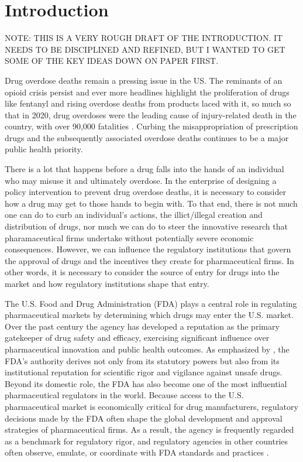 \section{Introduction}

NOTE: THIS IS A VERY ROUGH DRAFT OF THE INTRODUCTION. IT NEEDS TO BE DISCIPLINED AND REFINED, BUT I WANTED TO GET SOME OF THE KEY IDEAS DOWN ON PAPER FIRST.


Drug overdose deaths remain a pressing issue in the US. The reminants of an opioid crisis persist and ever more headlines highlight the proliferation of drugs like fentanyl and rising overdose deaths from products laced with it, so much so that in 2020, drug overdoses were the leading cause of injury-related death in the country, with over 90,000 fatalities \parencite{hedegaardDrugOverdoseDeaths2020a}. Curbing the misappropriation of prescription drugs and the subsequently associated overdose deaths continues to be a major public health priority.

There is a lot that happens before a drug falls into the hands of an individual who may misuse it and ultimately overdose. In the enterprise of designing a policy intervention to prevent drug overdose deaths, it is necessary to consider how a drug may get to those hands to begin with. To that end, there is not much one can do to curb an individual's actions, the illict/illegal creation and distribution of drugs, nor much we can do to steer the innovative research that pharamaceutical firms undertake without potentially severe economic consequences. However, we can influence the regulatory institutions that govern the approval of drugs and the incentives they create for pharmaceutical firms. In other words, it is necessary to consider the source of entry for drugs into the market and how regulatory institutions shape that entry.

The U.S. Food and Drug Administration (FDA) plays a central role in regulating pharmaceutical markets by determining which drugs may enter the U.S. market. Over the past century the agency has developed a reputation as the primary gatekeeper of drug safety and efficacy, exercising significant influence over pharmaceutical innovation and public health outcomes. As emphasized by \textcite{carpenterINTRODUCTIONGatekeeper2010}, the FDA’s authority derives not only from its statutory powers but also from its institutional reputation for scientific rigor and vigilance against unsafe drugs. Beyond its domestic role, the FDA has also become one of the most influential pharmaceutical regulators in the world. Because access to the U.S. pharmaceutical market is economically critical for drug manufacturers, regulatory decisions made by the FDA often shape the global development and approval strategies of pharmaceutical firms. As a result, the agency is frequently regarded as a benchmark for regulatory rigor, and regulatory agencies in other countries often observe, emulate, or coordinate with FDA standards and practices \parencite{carpenterAmericanPharmaceuticalRegulation2010}.


